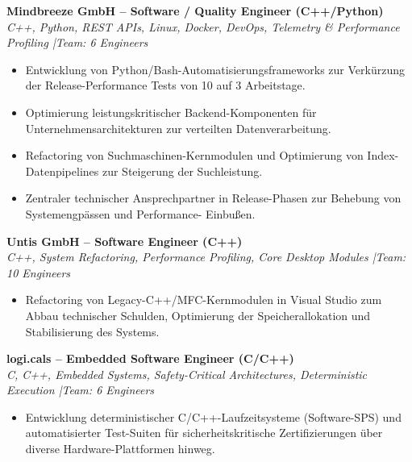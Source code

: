 \documentclass[10pt,a4paper]{article}
\begin{document}

\textbf{Mindbreeze GmbH -- Software / Quality Engineer (C++/Python)} \\
\textit{C++, Python, REST APIs, Linux, Docker, DevOps, Telemetry \& Performance Profiling \quad|\quad Team: 6 Engineers}
\begin{itemize}
    \item Entwicklung von Python/Bash-Automatisierungsframeworks zur Verkürzung der Release-Performance Tests von 10 auf 3 Arbeitstage.
    \item Optimierung leistungskritischer Backend-Komponenten für Unternehmensarchitekturen zur verteilten Datenverarbeitung.
    \item Refactoring von Suchmaschinen-Kernmodulen und Optimierung von Index-Datenpipelines zur Steigerung der Suchleistung.
    \item Zentraler technischer Ansprechpartner in Release-Phasen zur Behebung von Systemengpässen und Performance-
Einbußen.\end{itemize}

\vspace{0.15cm}
\textbf{Untis GmbH -- Software Engineer (C++)} \\
\textit{C++, System Refactoring, Performance Profiling, Core Desktop Modules \quad|\quad Team: 10 Engineers}
\begin{itemize}
    \item Refactoring von Legacy-C++/MFC-Kernmodulen in Visual Studio zum Abbau technischer Schulden, Optimierung der Speicherallokation und Stabilisierung des Systems.
\end{itemize}

\vspace{0.15cm}
\textbf{logi.cals -- Embedded Software Engineer (C/C++)} \\
\textit{C, C++, Embedded Systems, Safety-Critical Architectures, Deterministic Execution \quad|\quad Team: 6 Engineers}
\begin{itemize}
    \item Entwicklung deterministischer C/C++-Laufzeitsysteme (Software-SPS) und automatisierter Test-Suiten für sicherheitskritische Zertifizierungen über diverse Hardware-Plattformen hinweg.
\end{itemize}
\end{document}
